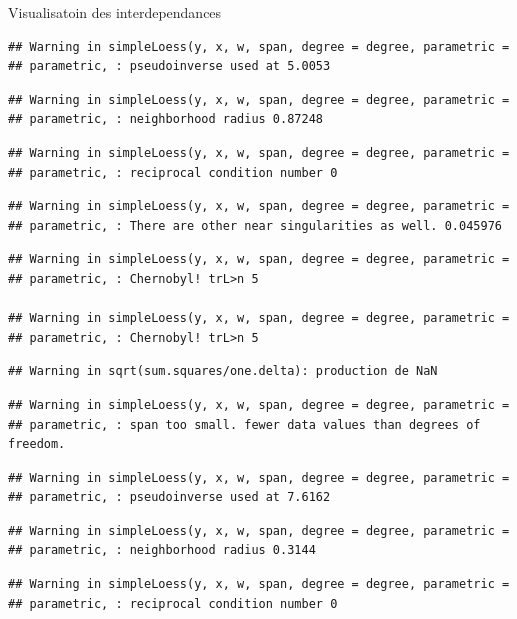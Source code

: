 \documentclass[11pt,ignorenonframetext,]{beamer}
\begin{document}
\begin{frame}[fragile]{Visualisatoin des interdependances}
\begin{verbatim}
## Warning in simpleLoess(y, x, w, span, degree = degree, parametric =
## parametric, : pseudoinverse used at 5.0053
\end{verbatim}

\begin{verbatim}
## Warning in simpleLoess(y, x, w, span, degree = degree, parametric =
## parametric, : neighborhood radius 0.87248
\end{verbatim}

\begin{verbatim}
## Warning in simpleLoess(y, x, w, span, degree = degree, parametric =
## parametric, : reciprocal condition number 0
\end{verbatim}

\begin{verbatim}
## Warning in simpleLoess(y, x, w, span, degree = degree, parametric =
## parametric, : There are other near singularities as well. 0.045976
\end{verbatim}

\begin{verbatim}
## Warning in simpleLoess(y, x, w, span, degree = degree, parametric =
## parametric, : Chernobyl! trL>n 5

## Warning in simpleLoess(y, x, w, span, degree = degree, parametric =
## parametric, : Chernobyl! trL>n 5
\end{verbatim}

\begin{verbatim}
## Warning in sqrt(sum.squares/one.delta): production de NaN
\end{verbatim}

\begin{verbatim}
## Warning in simpleLoess(y, x, w, span, degree = degree, parametric =
## parametric, : span too small. fewer data values than degrees of freedom.
\end{verbatim}

\begin{verbatim}
## Warning in simpleLoess(y, x, w, span, degree = degree, parametric =
## parametric, : pseudoinverse used at 7.6162
\end{verbatim}

\begin{verbatim}
## Warning in simpleLoess(y, x, w, span, degree = degree, parametric =
## parametric, : neighborhood radius 0.3144
\end{verbatim}

\begin{verbatim}
## Warning in simpleLoess(y, x, w, span, degree = degree, parametric =
## parametric, : reciprocal condition number 0
\end{verbatim}


\end{frame}
\end{document}
